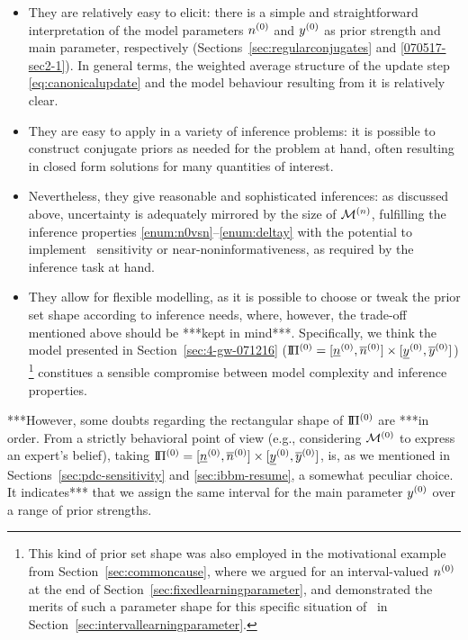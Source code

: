 \begin{itemize}
\item They are relatively easy to elicit:
there is a simple and straightforward interpretation of the model parameters $n^{(0)}$ and $y^{(0)}$
as prior strength and main parameter, respectively (Sections~\ref{sec:regularconjugates} and \ref{070517-sec2-1}).
In general terms, the weighted average structure of the update step \eqref{eq:canonicalupdate}
and the model behaviour resulting from it is relatively clear.
\item They are easy to apply in a variety of inference problems:
it is possible to construct conjugate priors as needed for the problem at hand,
often resulting in closed form solutions for many quantities of interest.
\item Nevertheless, they give reasonable and sophisticated inferences:
as discussed above, uncertainty is adequately mirrored by the size of $\mathcal{M}^{(n)}$,
fulfilling the inference properties \ref{enum:n0vsn}--\ref{enum:deltay}
with the potential to implement \pdc\ sensitivity or near-noninformativeness,
as required by the inference task at hand.
\item They allow for flexible modelling, as
it is possible to choose or tweak the prior set shape according to inference needs,
where, however, the trade-off mentioned above should be ***kept in mind***.
Specifically, we think the model presented in Section~\ref{sec:4-gw-071216}
($\text{I}\!\Pi^{(0)} = [\underline{n}^{(0)}, \overline{n}^{(0)}] \times [\underline{y}^{(0)}, \overline{y}^{(0)}]$)%
\footnote{This kind of prior set shape was also employed in the motivational example
from Section~\ref{sec:commoncause}, where we argued for an interval-valued $n^{(0)}$
at the end of Section~\ref{sec:fixedlearningparameter},
and demonstrated the merits of such a parameter shape for this specific situation of \pdc\
in Section~\ref{sec:intervallearningparameter}.}
constitues a sensible compromise between model complexity and inference properties.
\end{itemize}

***However, some doubts regarding the rectangular shape of $\text{I}\!\Pi^{(0)}$ are ***in order.
From a strictly behavioral point of view
(e.g., considering $\mathcal{M}^{(0)}$ to express an expert's belief),
taking $\text{I}\!\Pi^{(0)} = [\underline{n}^{(0)}, \overline{n}^{(0)}] \times [\underline{y}^{(0)}, \overline{y}^{(0)}]$,
is, as we mentioned in Sections~\ref{sec:pdc-sensitivity} and \ref{sec:ibbm-resume}, a somewhat peculiar choice.
It indicates*** that we assign the same interval for the main parameter $y^{(0)}$
over a range of prior strengths.

